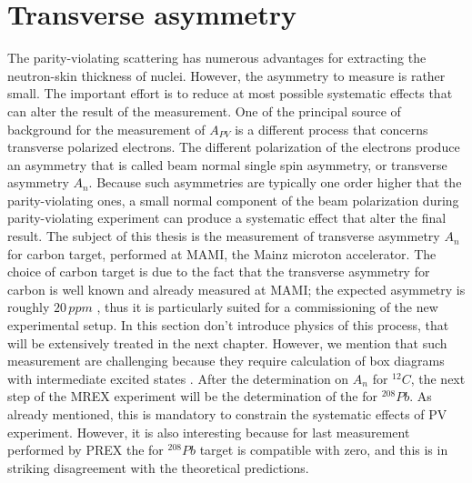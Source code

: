 \section{Transverse asymmetry}


The parity-violating scattering has numerous advantages for extracting the neutron-skin thickness of nuclei. However, the asymmetry to measure is rather small. The important effort is to reduce at most possible systematic effects that can alter the result of the measurement. One of the principal source of background for the measurement of $A_{PV}$ is a different process that concerns transverse polarized electrons. The different polarization of the electrons produce an asymmetry that is called beam normal single spin asymmetry, or transverse asymmetry $A_{n}$. Because such asymmetries are typically one order higher that the parity-violating ones, a small normal component of the beam polarization during parity-violating experiment can produce a systematic effect that alter the final result. The subject of this thesis is the measurement of transverse asymmetry $A_{n}$ for carbon target, performed at MAMI, the Mainz microton accelerator. The choice of carbon target is due to the fact that the transverse asymmetry for carbon is well known and already measured at MAMI; the expected asymmetry is roughly $20 \, ppm$ , thus it is particularly suited for a commissioning of the new experimental setup. In this section don't introduce physics of this process, that will be extensively treated in the next chapter. However, we mention that such measurement are challenging because they require calculation of box diagrams with intermediate excited states \cite{Gorchtein_2008}.
After the determination on $A_{n}$ for $^{12}C$, the next step of the MREX experiment will be the determination of the \trasv for $^{208}Pb$. As already mentioned, this is mandatory to constrain the systematic effects of PV experiment. However, it is also interesting because for last measurement performed by PREX \cite{PhysRevLett.109.192501} the \transv for $^{208}Pb$ target is compatible with zero, and this is in striking disagreement with the theoretical predictions. 



